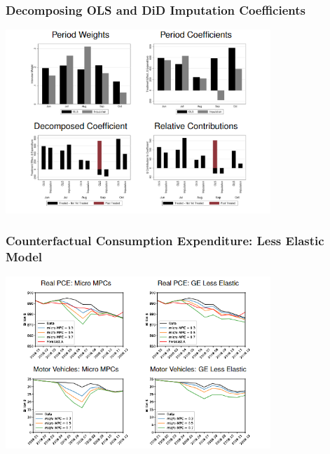 \documentclass[english,xcolor=svgnames]{beamer}
\begin{document}
\begin{frame}
\frametitle{Decomposing OLS and DiD Imputation Coefficients}
\begin{center}
\footnotesize
\centering
    \includegraphics[width=10cm]{figures/decompose_olsVbjs}
 \end{center} 
  \vspace{-0.5cm}
\end{frame}

\begin{frame}[label=baselinenominal]
\frametitle{Counterfactual Consumption Expenditure: Less Elastic Model}

\begin{center}
\footnotesize
\centering

    \includegraphics[width=10cm]{figures/macro_counterfactual2}
 \end{center} 
  \vspace{-0.5cm}
\end{frame}
\end{document}

